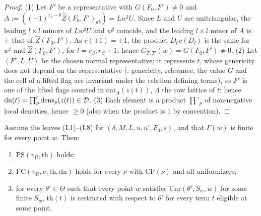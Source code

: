 \begin{proof}
(1) Let $F'$ be a representative with $G(F_0,F')\ne0$ and $A:=((-1)^{r_S-b}\widehat Z(F_0,F')_{ab})=Lw^\sharp U$. Since $L$ and $U$ are
unitriangular, the leading $l\times l$ minors of $Lw^\sharp U$ and $w^\sharp$ coincide, and the leading $l\times l$ minor of $A$ is
$\pm$ that of $\widehat Z(F_0,F')$. As $c(\pm1)=\pm1$, the product $D_l\,c(D_l)$ is the same for $w^\sharp$ and $\widehat Z(F_0,F')$, for
$l=r_S,r_S+1$; hence $G_{T,T'}(w)=G(F_0,F')\ne0$. (2) Let $(F',L,U)$ be the chosen normal representative; it represents $t$, whose
genericity does not depend on the representative (: genericity, relevance,
the value $G$ and the cell of a lifted flag are invariant under the relation defining terms), so $F'$ is one of the lifted
flags counted in $\mathrm{cnt}_\Lambda(z(t))$, $\Lambda$ the row lattice of $t$; hence $\mathrm{dn}(t)=\prod'_p\mathrm{dens}_p(z(t))\in\mathcal D$.
(3) Each element is a product $\prod'_p$ of non-negative local densities, hence $\ge0$ (also when the product is $1$ by convention).
\end{proof}

\begin{proposition}\label{pf:thmS-leaves:prop:fromleaves}
Assume the leaves (L1)--(L8) for $(\delta,M,L,u,u',F_0,s)$, and that $\Gamma(w)$ is finite for every point $w$. Then:
\begin{enumerate}
\item $\mathrm{PS}(v_R,\mathrm{th})$ holds;
\item $\mathrm{FC}(v_R,\nu,\mathrm{th},\mathrm{dn})$ holds for every $\nu$ with $\mathrm{CF}(\nu)$ and all uniformizers;
\item for every $\theta'\in\Theta$ such that every point $w$ satisfies $\mathrm{Unr}(\theta',S_w,w)$ for some finite $S_w$, $\mathrm{th}(t)$
is restricted with respect to $\theta'$ for every term $t$ eligible at some point.
\end{enumerate}
\end{proposition}


